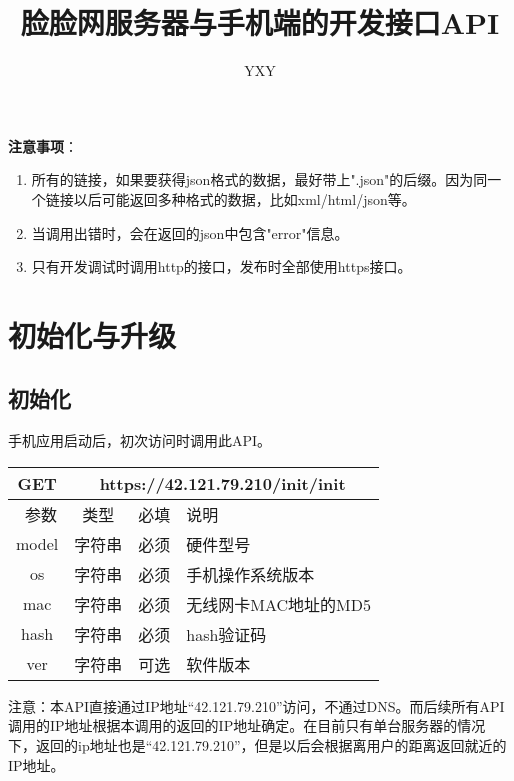 \documentclass[cs4size]{ctexartutf8}
\author{YXY}
\title{脸脸网服务器与手机端的开发接口API}
\begin{document}
 
\maketitle
\tableofcontents

\newpage

\textbf{注意事项}：
\begin{enumerate}
\item 所有的链接，如果要获得json格式的数据，最好带上".json"的后缀。因为同一个链接以后可能返回多种格式的数据，比如xml/html/json等。
\item 当调用出错时，会在返回的json中包含"error"信息。
\item 只有开发调试时调用http的接口，发布时全部使用https接口。
\end{enumerate}

\newpage

\section{初始化与升级}
\subsection{初始化}

手机应用启动后，初次访问时调用此API。
\begin{table}[H]
   \begin{center}
\begin{tabular}{|c|c|c|p{12cm}|}
\hline
GET & \multicolumn{3}{|c|}{https://42.121.79.210/init/init} \\
\hline\hline
 \  参数  & 类型 & 必填 &  说明  \\
 \hline
 model  & 字符串 & 必须 &  硬件型号\\
\hline
 os  & 字符串 & 必须 &  手机操作系统版本\\
 \hline
 mac  & 字符串 & 必须 &  无线网卡MAC地址的MD5\\
 \hline
 hash  & 字符串 & 必须 &  hash验证码\\
  \hline
 ver  & 字符串 & 可选 &  软件版本\\
\hline
\end{tabular}
   \end{center}
\end{table}

注意：本API直接通过IP地址“42.121.79.210”访问，不通过DNS。而后续所有API调用的IP地址根据本调用的返回的IP地址确定。在目前只有单台服务器的情况下，返回的ip地址也是“42.121.79.210”，但是以后会根据离用户的距离返回就近的IP地址。
\end{document}
